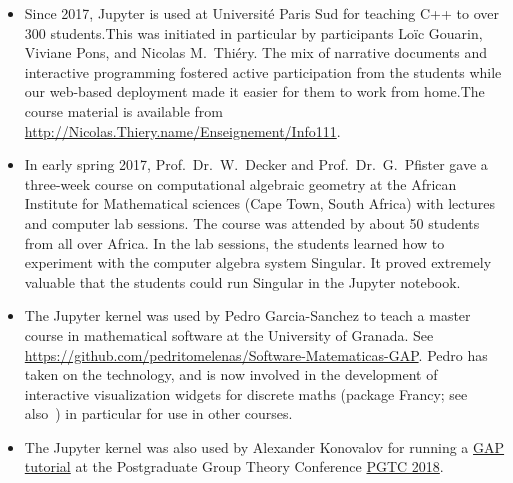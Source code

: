 \begin{Aim 1}
\begin{Aim 2}
\begin{itemize}
We worked on 14 tickets during the week, 6 of those which have been merged since the conference. All participants said they had learned new 
things and it would impact their careers. %

\subsection{Teaching}\label{teaching}
We showcase here a few of the many uses in teaching of the Jupyter kernels we contributed to:

     \item Since 2017, Jupyter is used at Université Paris Sud for teaching C++ to over 300 students.This was initiated in particular by
     \ODK participants Loïc Gouarin, Viviane Pons, and Nicolas M.\ Thiéry. The mix of narrative documents and interactive programming 
     fostered active participation from the students while our web-based deployment made it easier for them to work from home.The course 
     material is available from \url{http://Nicolas.Thiery.name/Enseignement/Info111}.
     
     \item In early spring 2017, Prof.~Dr.~W.~Decker and Prof.~Dr.~G.~Pfister gave a three-week course on computational algebraic geometry 
     at the African Institute for Mathematical sciences (Cape Town, South Africa) with lectures and computer lab sessions.
     The course was attended by about 50 students from all over Africa. In the lab sessions, the students learned how to experiment with the
     computer algebra system Singular. It proved extremely valuable that the students could run Singular in the Jupyter notebook.
     
     \item The \GAP Jupyter kernel was used by Pedro Garcia-Sanchez to teach a master course in mathematical software at the University of
     Granada. See  \url{https://github.com/pedritomelenas/Software-Matematicas-GAP}. Pedro has taken on the technology, and is now involved
     in the   development of interactive visualization widgets for discrete maths (package Francy; see also~) in particular for use in other courses.
     
     \item The \GAP Jupyter kernel was also used by Alexander Konovalov for running a \href{https://github.com/alex-konovalov/gap-teaching
     /}{GAP tutorial} at the Postgraduate Group Theory Conference \href{http://www-groups.mcs.st-and.ac.uk/~pgtc2018/}{PGTC 2018}.
     \end{itemize}




\end{Aim 2}
\end{Aim 1}

